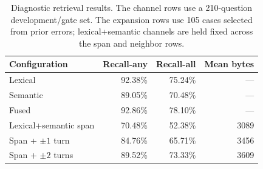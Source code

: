 \begin{table}[t]
\centering
\caption{Diagnostic retrieval results. The channel rows use a 210-question development/gate set. The expansion rows use 105 cases selected from prior errors; lexical+semantic channels are held fixed across the span and neighbor rows.}
\label{tab:diagnostics}
\small
\begin{tabular}{lrrr}
\toprule
Configuration & Recall-any & Recall-all & Mean bytes \\
\midrule
Lexical & 92.38\% & 75.24\% & --- \\
Semantic & 89.05\% & 70.48\% & --- \\
Fused & 92.86\% & 78.10\% & --- \\
\midrule
Lexical+semantic span & 70.48\% & 52.38\% & 3089 \\
Span + $\pm1$ turn & 84.76\% & 65.71\% & 3456 \\
Span + $\pm2$ turns & 89.52\% & 73.33\% & 3609 \\
\bottomrule
\end{tabular}
\end{table}
